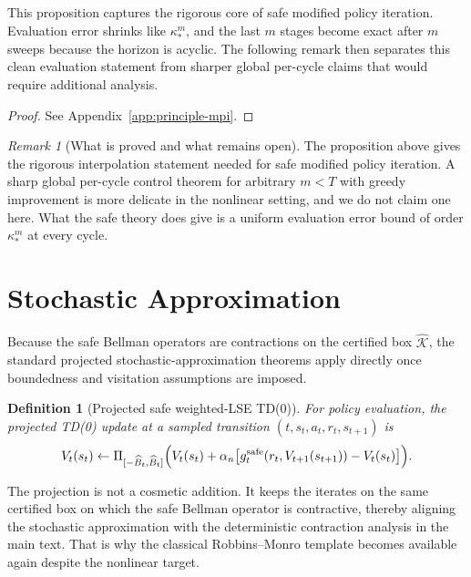\documentclass{article}
\newtheorem{definition}[definition]{Definition}
\theoremstyle{remark}
\newtheorem{remark}[remark]{Remark}
\newcommand{\safe}{\mathrm{safe}}
\newcommand{\Ksafe}{\widehat{\mathcal K}}
\newcommand{\Bhat}{\widehat B}
\begin{document}
This proposition captures the rigorous core of safe modified policy iteration.
Evaluation error shrinks like $\kappa_*^m$, and the last $m$ stages become exact after $m$ sweeps because the horizon is acyclic.
The following remark then separates this clean evaluation statement from sharper global per-cycle claims that would require additional analysis.

\begin{proof}
See Appendix~\ref{app:principle-mpi}.
\end{proof}

\begin{remark}[What is proved and what remains open]
\label{rem:mpi-open}
The proposition above gives the rigorous interpolation statement needed for safe modified policy iteration.
A sharp global per-cycle control theorem for arbitrary $m<T$ with greedy improvement is more delicate in the nonlinear setting, and we do not claim one here.
What the safe theory does give is a uniform evaluation error bound of order $\kappa_*^m$ at every cycle.
\end{remark}

\section{Stochastic Approximation}
\label{sec:stochastic}

Because the safe Bellman operators are contractions on the certified box $\Ksafe$, the standard projected stochastic-approximation theorems apply directly once boundedness and visitation assumptions are imposed.

\begin{definition}[Projected safe weighted-LSE TD(0)]
\label{def:lse-td0}
For policy evaluation, the projected TD(0) update at a sampled transition $(t,s_t,a_t,r_t,s_{t+1})$ is
\begin{equation}
V_t(s_t)
\leftarrow
\Pi_{[-\Bhat_t,\Bhat_t]}
\Bigl(V_t(s_t) + \alpha_n\bigl[g_t^{\safe}(r_t,V_{t+1}(s_{t+1})) - V_t(s_t)\bigr]\Bigr).
\label{eq:safe-td0}
\end{equation}
\end{definition}

The projection is not a cosmetic addition.
It keeps the iterates on the same certified box on which the safe Bellman operator is contractive, thereby aligning the stochastic approximation with the deterministic contraction analysis in the main text.
That is why the classical Robbins--Monro template becomes available again despite the nonlinear target.
\end{document}

